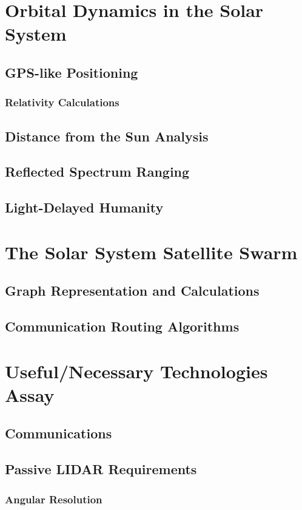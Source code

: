 \documentclass{article}
\begin{document}
\section{Orbital Dynamics in the Solar System}
    \subsection{GPS-like Positioning}
        \subsubsection{Relativity Calculations}
    \subsection{Distance from the Sun Analysis}
    \subsection{Reflected Spectrum Ranging}
    \subsection{Light-Delayed Humanity}
    
\section{The Solar System Satellite Swarm}
        \subsection{Graph Representation and Calculations}
        \subsection{Communication Routing Algorithms}
        
\section{Useful/Necessary Technologies Assay}
    \subsection{Communications}
    \subsection{Passive LIDAR Requirements}
        \subsubsection{Angular Resolution}
\end{document}
